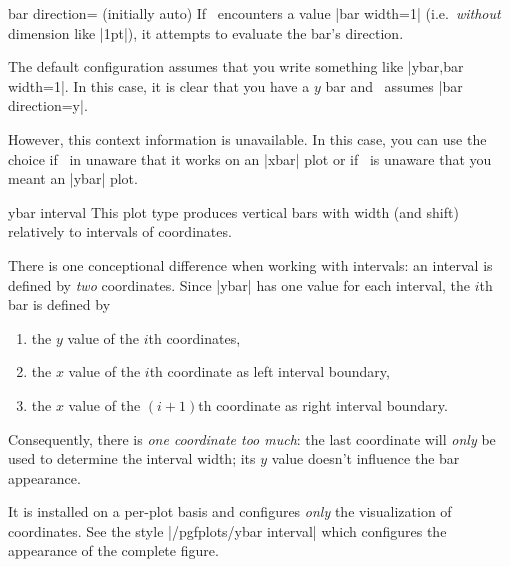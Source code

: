{\begin{pgfplotskey}{bar direction= (initially auto)}
	If \PGFPlots\ encounters a value |bar width=1| (i.e.\ \emph{without} dimension like |1pt|), it attempts to evaluate the bar's direction.

	The default configuration  assumes that you write something like |ybar,bar width=1|. In this case, it is clear that you have a $y$ bar and \PGFPlots\ assumes |bar direction=y|.

	However, this context information is unavailable. In this case, you can use the choice  if \PGFPlots\ in unaware that it works on an |xbar| plot or  if \PGFPlots\ is unaware that you meant an |ybar| plot.
\end{pgfplotskey}

\begin{plottype}{ybar interval}
	This plot type produces vertical bars with width (and shift) relatively to intervals of coordinates.

	There is one conceptional difference when working with intervals: an interval is defined by \emph{two} coordinates. Since |ybar| has one value for each interval, the $i$th bar is defined by
	\begin{enumerate}
		\item the $y$ value of the $i$th coordinates,
		\item the $x$ value of the $i$th coordinate as left interval boundary,
		\item the $x$ value of the $(i+1)$th coordinate as right interval boundary.
	\end{enumerate}
	Consequently, there is \emph{one coordinate too much}: the last coordinate will \emph{only} be used to determine the interval width; its $y$ value doesn't influence the bar appearance.

	It is installed on a per-plot basis and configures \emph{only} the visualization of coordinates. See the style |/pgfplots/ybar interval| which configures the appearance of the complete figure.
\begin{codeexample}[]
\end{codeexample}


\end{plottype}}
